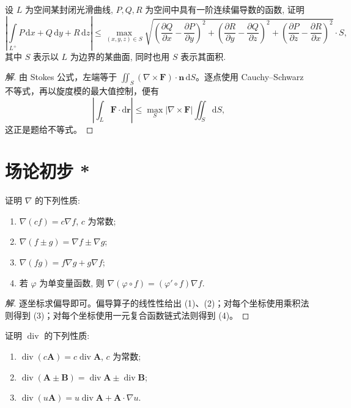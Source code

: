 \documentclass[../../数学分析培优讲义(答案版).tex]{subfiles}
\begin{document}
\begin{example}
设 $L$ 为空间某封闭光滑曲线, $P,Q,R$ 为空间中具有一阶连续偏导数的函数, 证明
\[
\left|\int\limits_{L^+}P\,\mathrm{d}x+Q\,\mathrm{d}y+R\,\mathrm{d}z\right|
\leq
\max_{(x,y,z)\in S}
\sqrt{
\left(\dfrac{\partial Q}{\partial x}-\dfrac{\partial P}{\partial y}\right)^2+
\left(\dfrac{\partial R}{\partial y}-\dfrac{\partial Q}{\partial z}\right)^2+
\left(\dfrac{\partial P}{\partial z}-\dfrac{\partial R}{\partial x}\right)^2}
\cdot S,
\]
其中 $S$ 表示以 $L$ 为边界的某曲面, 同时也用 $S$ 表示其面积.
\end{example}

\begin{proof}[解]
由 Stokes 公式，左端等于 $\iint_S(\nabla\times\bm F)\cdot\bm n\,\mathrm{d}S$。逐点使用 Cauchy--Schwarz 不等式，再以旋度模的最大值控制，便有
\[
\left|\int_L\bm F\cdot\mathrm{d}\bm r\right|
\leq\max_S|\nabla\times\bm F|\iint_S\mathrm{d}S,
\]
这正是题给不等式。
\end{proof}

\newpage

\section{场论初步 *}

\begin{example}
证明 $\nabla$ 的下列性质:
\begin{enumerate}[label=(\arabic*)]
    \item $\nabla(cf)=c\nabla f$, $c$ 为常数;
    \item $\nabla(f\pm g)=\nabla f\pm\nabla g$;
    \item $\nabla(fg)=f\nabla g+g\nabla f$;
    \item 若 $\varphi$ 为单变量函数, 则 $\nabla(\varphi\circ f)=(\varphi'\circ f)\nabla f$.
\end{enumerate}
\end{example}

\begin{proof}[解]
逐坐标求偏导即可。偏导算子的线性性给出 (1)、(2)；对每个坐标使用乘积法则得到 (3)；对每个坐标使用一元复合函数链式法则得到 (4)。
\end{proof}

\begin{example}
证明 $\operatorname{div}$ 的下列性质:
\begin{enumerate}[label=(\arabic*)]
    \item $\operatorname{div}(c\bm A)=c\operatorname{div}\bm A$, $c$ 为常数;
    \item $\operatorname{div}(\bm A\pm\bm B)=\operatorname{div}\bm A\pm\operatorname{div}\bm B$;
    \item $\operatorname{div}(u\bm A)=u\operatorname{div}\bm A+\bm A\cdot\nabla u$.
\end{enumerate}
\end{example}
\end{document}
